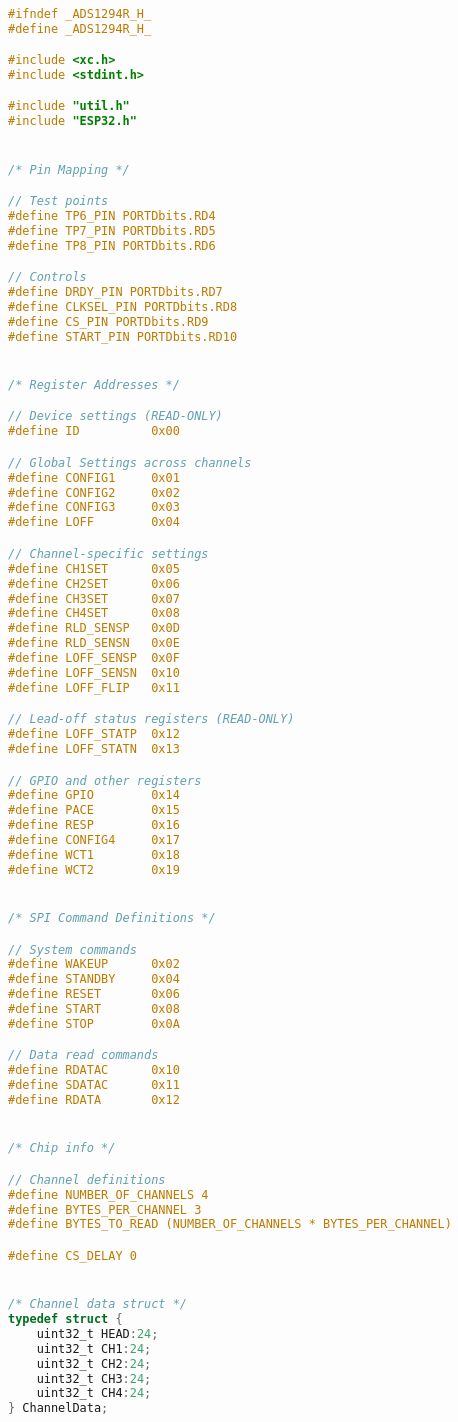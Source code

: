 \begin{lstlisting}[language=C]

#ifndef _ADS1294R_H_
#define _ADS1294R_H_

#include <xc.h>
#include <stdint.h>

#include "util.h"
#include "ESP32.h"


/* Pin Mapping */

// Test points
#define TP6_PIN PORTDbits.RD4
#define TP7_PIN PORTDbits.RD5
#define TP8_PIN PORTDbits.RD6

// Controls
#define DRDY_PIN PORTDbits.RD7
#define CLKSEL_PIN PORTDbits.RD8
#define CS_PIN PORTDbits.RD9
#define START_PIN PORTDbits.RD10


/* Register Addresses */

// Device settings (READ-ONLY)
#define ID          0x00

// Global Settings across channels
#define CONFIG1     0x01
#define CONFIG2     0x02
#define CONFIG3     0x03
#define LOFF        0x04

// Channel-specific settings
#define CH1SET      0x05
#define CH2SET      0x06
#define CH3SET      0x07
#define CH4SET      0x08
#define RLD_SENSP   0x0D
#define RLD_SENSN   0x0E
#define LOFF_SENSP  0x0F
#define LOFF_SENSN  0x10
#define LOFF_FLIP   0x11

// Lead-off status registers (READ-ONLY)
#define LOFF_STATP  0x12
#define LOFF_STATN  0x13

// GPIO and other registers
#define GPIO        0x14
#define PACE        0x15
#define RESP        0x16
#define CONFIG4     0x17
#define WCT1        0x18
#define WCT2        0x19


/* SPI Command Definitions */

// System commands
#define WAKEUP      0x02
#define STANDBY     0x04
#define RESET       0x06
#define START       0x08
#define STOP        0x0A

// Data read commands
#define RDATAC      0x10
#define SDATAC      0x11
#define RDATA       0x12


/* Chip info */

// Channel definitions
#define NUMBER_OF_CHANNELS 4
#define BYTES_PER_CHANNEL 3
#define BYTES_TO_READ (NUMBER_OF_CHANNELS * BYTES_PER_CHANNEL)

#define CS_DELAY 0


/* Channel data struct */
typedef struct {
    uint32_t HEAD:24;
    uint32_t CH1:24;
    uint32_t CH2:24;
    uint32_t CH3:24;
    uint32_t CH4:24;
} ChannelData;


\end{lstlisting}
